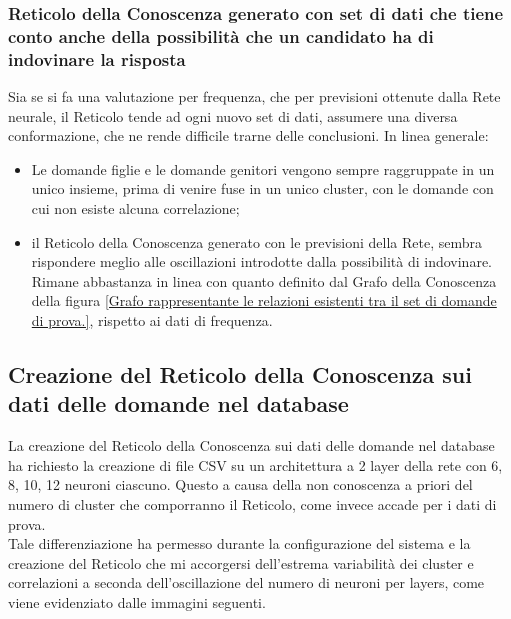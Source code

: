 \subsubsection{Reticolo della Conoscenza generato con set di dati che tiene conto anche della possibilit\`a che un candidato ha di indovinare la risposta}
\label{Reticolo della Conoscenza generato con set di dati che tiene conto anche della possibilit\`a che un candidato ha di indovinare la risposta}
Sia se si fa una valutazione per frequenza, che per previsioni ottenute dalla Rete neurale, il Reticolo tende ad ogni nuovo set di dati, assumere una diversa conformazione, che ne rende difficile trarne delle conclusioni.
In linea generale:
\begin{itemize}
\item Le domande figlie e le domande genitori vengono sempre raggruppate in un unico insieme, prima di venire fuse in un unico cluster, con le domande con cui non esiste alcuna correlazione;
\item il Reticolo della Conoscenza generato con le previsioni della Rete, sembra rispondere meglio alle oscillazioni introdotte dalla possibilit\`a di indovinare. Rimane abbastanza in linea con quanto definito dal Grafo della Conoscenza della figura \ref{Grafo rappresentante le relazioni esistenti tra il set di domande di prova.}, rispetto ai dati di frequenza.
\end{itemize}





\subsection{Creazione del Reticolo della Conoscenza sui dati delle domande nel database}
\label{Creazione del Reticolo della Conoscenza sui dati delle domande nel database}

La creazione del Reticolo della Conoscenza sui dati delle domande nel database ha richiesto la creazione di file CSV su un architettura a 2 layer della rete con 6, 8, 10, 12 neuroni ciascuno. Questo a causa della non conoscenza a priori del numero di cluster che comporranno il Reticolo, come invece accade per i dati di prova.\\
Tale differenziazione ha permesso durante la configurazione del sistema e la creazione del Reticolo che mi accorgersi dell'estrema variabilit\`a dei cluster e correlazioni a seconda dell'oscillazione del numero di neuroni per layers, come viene evidenziato dalle immagini seguenti.


